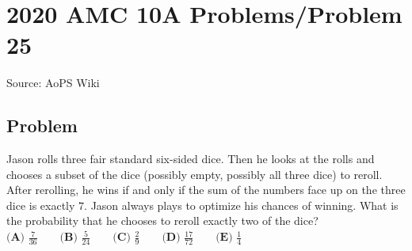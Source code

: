 \documentclass[12pt]{article}
\begin{document}
\section*{{2020 AMC 10A Problems/Problem 25}}
Source: AoPS Wiki

\subsection*{Problem}
Jason rolls three fair standard six-sided dice. Then he looks at the rolls and chooses a subset of the dice (possibly empty, possibly all three dice) to reroll. After rerolling, he wins if and only if the sum of the numbers face up on the three dice is exactly $7.$ Jason always plays to optimize his chances of winning. What is the probability that he chooses to reroll exactly two of the dice? $\textbf{(A) } \frac{7}{36} \qquad\textbf{(B) } \frac{5}{24} \qquad\textbf{(C) } \frac{2}{9} \qquad\textbf{(D) } \frac{17}{72} \qquad\textbf{(E) } \frac{1}{4}$
\end{document}
